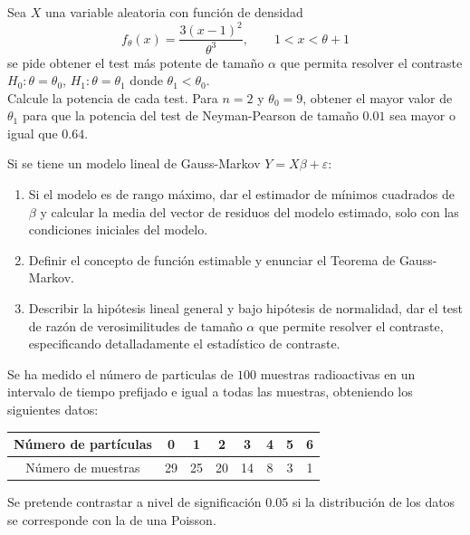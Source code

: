 \documentclass[12pt]{article}
\begin{document}
    \begin{ejercicio}[2 puntos]
        Sea $X$ una variable aleatoria con función de densidad
        \begin{equation*}
            f_\theta(x) = \frac{3{(x-1)}^{2}}{\theta^3}, \qquad 1<x<\theta +1
        \end{equation*}
        se pide obtener el test más potente de tamaño $\alpha$ que permita resolver el contraste $H_0:\theta = \theta_0$, $H_1:\theta=\theta_1$ donde $\theta_1<\theta_0$.\\

        \noindent
        Calcule la potencia de cada test. Para $n=2$ y $\theta_0=9$, obtener el mayor valor de $\theta_1$ para que la potencia del test de Neyman-Pearson de tamaño $0.01$ sea mayor o igual que $0.64$.
    \end{ejercicio}

    \newpage

    \begin{ejercicio}[1.25 puntos]
        Si se tiene un modelo lineal de Gauss-Markov $Y=X\beta + \varepsilon$:
        \begin{enumerate}[label=\alph*)]
            \item Si el modelo es de rango máximo, dar el estimador de mínimos cuadrados de $\beta$ y calcular la media del vector de residuos del modelo estimado, solo con las condiciones iniciales del modelo.
            \item Definir el concepto de función estimable y enunciar el Teorema de Gauss-Markov.
            \item Describir la hipótesis lineal general y bajo hipótesis de normalidad, dar el test de razón de verosimilitudes de tamaño $\alpha$ que permite resolver el contraste, especificando detalladamente el estadístico de contraste.
        \end{enumerate}
    \end{ejercicio}

    \begin{ejercicio}[1 punto]
        Se ha medido el número de particulas de $100$ muestras radioactivas en un intervalo de tiempo prefijado e igual a todas las muestras, obteniendo los siguientes datos:
        \begin{table}[H]
        \centering
        \begin{tabular}{c|ccccccc}
            Número de partículas & 0 & 1 & 2 & 3 & 4 & 5 & 6 \\
            \hline
            Número de muestras & 29 & 25 & 20 & 14 & 8 & 3 & 1
        \end{tabular}
        \end{table}
        \noindent
        Se pretende contrastar a nivel de significación $0.05$ si la distribución de los datos se corresponde con la de una Poisson.
    \end{ejercicio}
\end{document}
